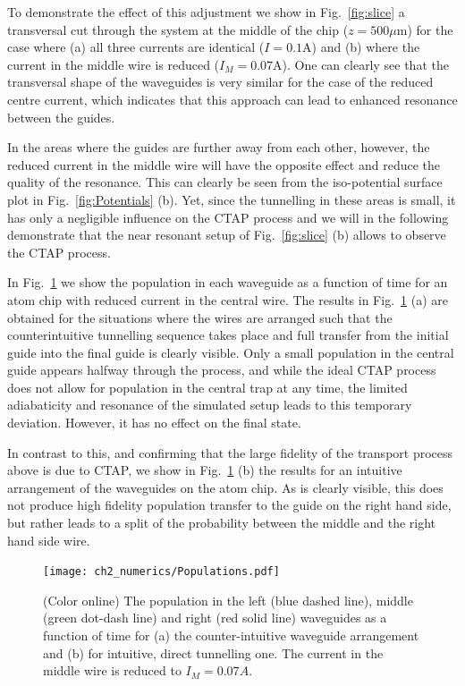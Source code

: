 To demonstrate the effect of this adjustment we show in Fig.~\ref{fig:slice} a transversal cut through the system at the middle of the chip ($z=500 \mu$m) for the case where (a) all three currents are identical ($I=0.1$A) and (b) where the current in the middle wire is reduced ($I_M=0.07$A). One can clearly see that the transversal shape of the waveguides is very similar for the case of the reduced centre current, which indicates that this approach can lead to enhanced resonance between the guides.

In the areas where the guides are further away from each other, however, the reduced current in the middle wire will have the opposite effect and reduce the quality of the resonance. This can clearly be seen from the iso-potential surface plot in Fig.~\ref{fig:Potentials} (b). Yet, since the tunnelling in these areas is small, it has only a negligible influence on the CTAP process and we will in the following demonstrate that the near resonant setup of Fig.~\ref{fig:slice} (b) allows to observe the CTAP process.

In Fig.~\ref{fig:Populations} we show the population in each waveguide as a function of time for an atom chip with reduced current in the central wire. The results in Fig.~\ref{fig:Populations} (a) are obtained for the situations where the wires are arranged such that the counterintuitive tunnelling sequence takes place and full transfer from the initial guide into the final guide is clearly visible. Only a small population in the central guide appears halfway through the process, and while the ideal CTAP process does not allow for population in the central trap at any time, the limited adiabaticity and resonance of the simulated setup leads to this temporary deviation. However, it has no effect on the final state.

In contrast to this, and confirming that the large fidelity of the transport process above is due to CTAP, we show in Fig.~\ref{fig:Populations} (b) the results for an intuitive arrangement of the waveguides on the atom chip. As is clearly visible, this does not produce high fidelity population transfer to the guide on the right hand side, but rather leads to a split of the probability between the middle and the right hand side wire.

\begin{figure}[tb]
  \texttt{[image: ch2\_numerics/Populations.pdf]}
  \caption{(Color online) The population in the left (blue dashed line), middle (green dot-dash line) and right (red solid line) waveguides as a function of time for (a) the counter-intuitive waveguide arrangement and (b) for intuitive, direct tunnelling one. The current in the middle wire is reduced to $I_M=0.07 A$.}
  \label{fig:Populations}
\end{figure}

